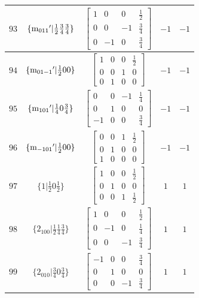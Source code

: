 \documentclass[fleqn,8pt]{jsarticle}
\begin{document}
\begin{longtable}{ccccc}
$ 93 $ & $ \{{\rm m}_{011}{}'|\frac{1}{2} \frac{3}{4} \frac{3}{4}\} $ & $ \begin{bmatrix} 1 & 0 & 0 & \frac{1}{2} \\ 0 & 0 & -1 & \frac{3}{4} \\ 0 & -1 & 0 & \frac{3}{4} \end{bmatrix} $ & $ -1 $ & $ -1 $ \\ \hline
$ 94 $ & $ \{{\rm m}_{01-1}{}'|\frac{1}{2} 0 0\} $ & $ \begin{bmatrix} 1 & 0 & 0 & \frac{1}{2} \\ 0 & 0 & 1 & 0 \\ 0 & 1 & 0 & 0 \end{bmatrix} $ & $ -1 $ & $ -1 $ \\ \hline
$ 95 $ & $ \{{\rm m}_{101}{}'|\frac{1}{4} 0 \frac{3}{4}\} $ & $ \begin{bmatrix} 0 & 0 & -1 & \frac{1}{4} \\ 0 & 1 & 0 & 0 \\ -1 & 0 & 0 & \frac{3}{4} \end{bmatrix} $ & $ -1 $ & $ -1 $ \\ \hline
$ 96 $ & $ \{{\rm m}_{-101}{}'|\frac{1}{2} 0 0\} $ & $ \begin{bmatrix} 0 & 0 & 1 & \frac{1}{2} \\ 0 & 1 & 0 & 0 \\ 1 & 0 & 0 & 0 \end{bmatrix} $ & $ -1 $ & $ -1 $ \\ \hline
$ 97 $ & $ \{1|\frac{1}{2} 0 \frac{1}{2}\} $ & $ \begin{bmatrix} 1 & 0 & 0 & \frac{1}{2} \\ 0 & 1 & 0 & 0 \\ 0 & 0 & 1 & \frac{1}{2} \end{bmatrix} $ & $ 1 $ & $ 1 $ \\ \hline
$ 98 $ & $ \{2{}_{100}|\frac{1}{2} \frac{1}{4} \frac{3}{4}\} $ & $ \begin{bmatrix} 1 & 0 & 0 & \frac{1}{2} \\ 0 & -1 & 0 & \frac{1}{4} \\ 0 & 0 & -1 & \frac{3}{4} \end{bmatrix} $ & $ 1 $ & $ 1 $ \\ \hline
$ 99 $ & $ \{2{}_{010}|\frac{3}{4} 0 \frac{3}{4}\} $ & $ \begin{bmatrix} -1 & 0 & 0 & \frac{3}{4} \\ 0 & 1 & 0 & 0 \\ 0 & 0 & -1 & \frac{3}{4} \end{bmatrix} $ & $ 1 $ & $ 1 $ \\ \hline

\end{longtable}
\end{document}
